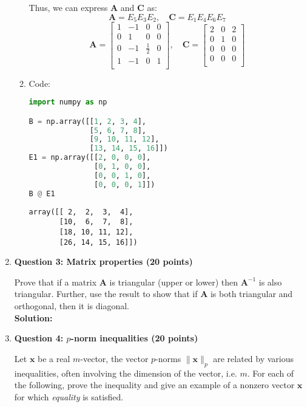 \documentclass[11pt,letterpaper]{article}
\begin{document}
\begin{enumerate}
\begin{enumerate}
\[    \]
    Thus, we can express $\mathbf{A}$ and $\mathbf{C}$ as:
    \[
        \mathbf{A} = E_5E_3E_2, \quad \mathbf{C} = E_1E_4E_6E_7
    \]
    \[
        \mathbf{A} = \begin{bmatrix}
            1 & -1 & 0 & 0\\
            0 & 1 & 0 & 0\\
            0 & -1 & \frac{1}{2} & 0\\
            1 & -1 & 0 & 1\\
        \end{bmatrix}, \quad
        \mathbf{C} = \begin{bmatrix}
            2 & 0 & 2\\
            0 & 1 & 0\\
            0 & 0 & 0\\
            0 & 0 & 0\\
        \end{bmatrix}
    \]
    \item Code:
\begin{lstlisting}[language=python]
import numpy as np

B = np.array([[1, 2, 3, 4],
              [5, 6, 7, 8],
              [9, 10, 11, 12],
              [13, 14, 15, 16]])
E1 = np.array([[2, 0, 0, 0],
               [0, 1, 0, 0],
               [0, 0, 1, 0],
               [0, 0, 0, 1]])
B @ E1
\end{lstlisting}
\begin{verbatim}
array([[ 2,  2,  3,  4],
       [10,  6,  7,  8],
       [18, 10, 11, 12],
       [26, 14, 15, 16]])
\end{verbatim}
\end{enumerate}

\clearpage
\item[] \textbf{Question 3: Matrix properties (20 points)} 

Prove that if a matrix $\mathbf{A}$ is triangular (upper or lower) then $\mathbf{A}^{-1}$ is also triangular. Further, use the result to show that if $\mathbf{A}$ is both triangular and orthogonal, then it is diagonal. \\

\textbf{Solution:}

\clearpage
\item[] \textbf{Question 4: $p$-norm inequalities (20 points)}

Let $\mathbf{x}$ be a real $m$-vector, the vector $p$-norms $\lVert \mathbf{x} \rVert_{p}$ are related by various inequalities, often involving the dimension of the vector, i.e. $m$. For each of the following, prove the inequality and give an example of a nonzero vector $\mathbf{x}$ for which \textit{equality} is satisfied. 
   

\end{enumerate}
\end{document}
